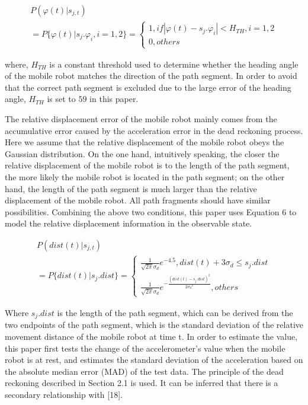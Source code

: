 \documentclass{llncs}
\begin{document}
\begin{equation}
\begin{array}{l}
P(\varphi (t)|{s_{j,t}})\\
= P\{ \varphi (t)|{s_j}.{\varphi _i},i = 1,2\}  = \left\{ {\begin{array}{*{20}{l}}
	{1,if|\varphi (t) - {s_j}.{\varphi _i}| < {H_{TH}},i = 1,2}\\
	{0,others}
	\end{array}} \right.
\end{array}
\end{equation}

where, $H_{TH}$ is a constant threshold used to determine whether the heading angle of the mobile robot matches the direction of the path segment. In order to avoid that the correct path segment is excluded due to the large error of the heading angle, $H_{TH}$ is set to $59$ in this paper.

The relative displacement error of the mobile robot mainly comes from the accumulative error caused by the acceleration error in the dead reckoning process. Here we assume that the relative displacement of the mobile robot obeys the Gaussian distribution. On the one hand, intuitively speaking, the closer the relative displacement of the mobile robot is to the length of the path segment, the more likely the mobile robot is located in the path segment; on the other hand, the length of the path segment is much larger than the relative displacement of the mobile robot. All path fragments should have similar possibilities. Combining the above two conditions, this paper uses Equation 6 to model the relative displacement information in the observable state.

\begin{equation}
\begin{array}{l}
P(dist(t)|{s_{j,t}})\\
= P\{ dist(t)|{s_j}.dist\}  = \left\{ {\begin{array}{*{20}{l}}
	{\frac{1}{{\sqrt {2\pi } {\sigma _d}}}{e^{ - 4.5}},dist(t) + 3{\sigma _d} \le {s_j}.dist}\\
	{\frac{1}{{\sqrt {2\pi } {\sigma _d}}}{e^{ - \frac{{{{(dist(t) - {s_j}.dist)}^2}}}{{2{\sigma _d}^2}}}},others}
	\end{array}} \right.
\end{array}
\end{equation}

Where ${s_j}.dist$ is the length of the path segment, which can be derived from the two endpoints of the path segment, which is the standard deviation of the relative movement distance of the mobile robot at time t. In order to estimate the value, this paper first tests the change of the accelerometer's value when the mobile robot is at rest, and estimates the standard deviation of the acceleration based on the absolute median error (MAD) of the test data. The principle of the dead reckoning described in Section 2.1 is used. It can be inferred that there is a secondary relationship with [18].
\end{document}
